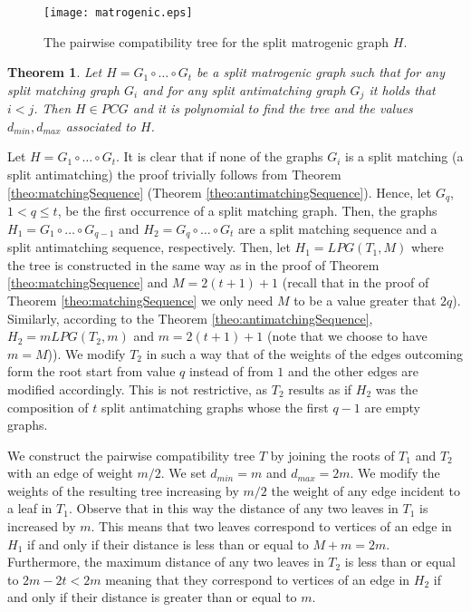 \documentclass[dvipdfm]{llncs}
\newtheorem{Theorem}{Theorem}
\newcommand{\dmin}{d_{min}}
\newcommand{\dmax}{d_{max}}
\begin{document}
\begin{figure}[!ht]
  \begin{center}
\texttt{[image: matrogenic.eps]}
  \end{center}
\caption{\footnotesize{The pairwise compatibility tree for the split matrogenic graph $H$. }}
\label{fig:matchingAntimatching}
\end{figure}


\begin{Theorem}
Let $H=G_1 \circ \ldots \circ G_t$ be a split matrogenic graph such that for any split matching graph $G_i$ and for any split antimatching graph $G_j$ it holds  that $i<j$. Then $H \in PCG$ and it is polynomial to find the tree and the values $\dmin, \dmax$ associated to $H$.
\end{Theorem}
\proof
Let $H=G_1 \circ \ldots \circ G_t$. It is clear that if none of the graphs $G_i$ is a split matching (a split antimatching) the proof trivially follows from Theorem \ref{theo:matchingSequence} (Theorem \ref{theo:antimatchingSequence}). Hence, let $G_q$, $1 < q \leq t$, be the first occurrence of a split matching graph. Then, the graphs $H_1= G_1 \circ \ldots \circ G_{q-1}$ and $H_2= G_q \circ \ldots \circ G_t$ are a split matching sequence and a split antimatching sequence, respectively.
Then, let $H_1=LPG(T_1,M)$ where the tree is constructed in the same way as in the proof of Theorem \ref{theo:matchingSequence} and $M=2(t+1)+1$ (recall that in the proof of Theorem \ref{theo:matchingSequence}  we only need $M$ to be a value greater that $2q$). Similarly, according to the Theorem  \ref{theo:antimatchingSequence}, $H_2=mLPG(T_2,m)$ and $m=2(t+1)+1$ (note that we choose to have $m=M$)). We modify $T_2$ in such a way that of the weights of the edges outcoming form the root start from value $q$ instead of from $1$ and the other edges are modified accordingly. This is not restrictive, as $T_2$ results as if $H_2$ was the composition of $t$ split antimatching graphs whose the first $q-1$ are empty graphs.



We construct the pairwise compatibility tree $T$ by joining the roots of $T_1$ and $T_2$ with an edge of weight $m/2$. We set $\dmin=m$ and $\dmax=2m$. We modify the weights of the resulting tree increasing by $m/2$ the weight of any edge incident to a leaf in $T_1$.  Observe that in this way the distance of any two leaves in $T_1$ is increased by $m$. This means that two leaves correspond to vertices of an edge in $H_1$ if and only if their distance is less than or equal to $M+m=2m$. Furthermore, the maximum distance of any two leaves in $T_2$ is less than or equal to $2m-2t < 2m$ meaning that they correspond to vertices of an edge in $H_2$ if and only if their distance is greater than or equal to $m$. 
\end{document}
